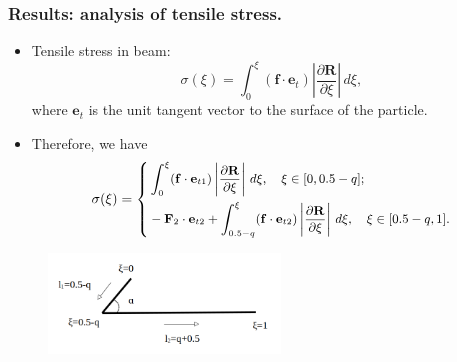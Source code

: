 \documentclass{beamer}
\begin{document}
\begin{frame}
	\frametitle{Results: analysis of tensile stress.}
	\begin{overlayarea}{\textwidth}{\textheight}
		\vspace{-0.3cm}
	\begin{itemize}
		\item \small Tensile stress in beam:
		\begin{equation*}
			\sigma(\xi)=\int_0^\xi (\mathbf{f}\cdot\mathbf{e}_t) \left |\frac{\partial \mathbf{R}}{\partial \xi}\right|\,d\xi,
		\end{equation*}
		where $\mathbf{e}_t$ is the unit tangent vector to the surface of the particle. 
	\item \small Therefore, we have 
	\begin{equation*}\small 
		\sigma(\xi)=\left\{
		\begin{aligned}
			\label{eq:4}
			&\int_0^\xi (\mathbf{f}\cdot\mathbf{e}_{t1}) \left |\frac{\partial \mathbf{R}}{\partial \xi}\right|\,d\xi,\quad \xi\in[0,0.5-q];\\
			&-\mathbf{F}_2\cdot\mathbf{e}_{t2}+\int_{0.5-q}^\xi (\mathbf{f}\cdot\mathbf{e}_{t2}) \left |\frac{\partial \mathbf{R}}{\partial \xi}\right|\,d\xi, \quad \xi\in[0.5-q,1].
		\end{aligned}\right.
	\end{equation*}
	\end{itemize}\vspace{-0.4cm}
	\begin{figure}[htb]
	\begin{center}
		\includegraphics[width=0.55\textwidth]{plots/tensile_boomerang.png}
	\end{center}
\end{figure}
	\end{overlayarea}
\end{frame}

\end{document}
